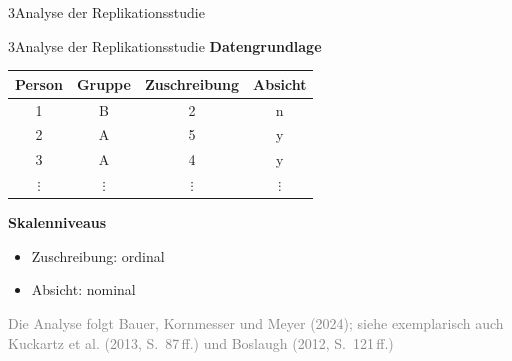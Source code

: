 \documentclass[xcolor=table,9pt,aspectratio=169]{beamer}
\begin{document}
\begin{frame}
\begin{overlayarea}{\textwidth}{0.81\paperheight}{
   \vspace*{11mm}
   \textcolor{uolblue}
   {3\hspace*{1em}Analyse der Replikationsstudie}
}
\end{overlayarea}
\end{frame}


\begin{frame}{\vspace*{10mm}3\hspace*{1em}Analyse der Replikationsstudie}
\textbf{Datengrundlage}\\
\smallskip
\begin{tabular}[h]{cccc}
   \arrayrulecolor{blue2}\hline
   Person     & Gruppe     & Zuschreibung   & Absicht    \\
   \hline
   1          & B          & 2              & n          \\
   2          & A          & 5              & y          \\
   3          & A          & 4              & y          \\
   $\vdots$   & $\vdots$   & $\vdots$       & $\vdots$   \\
   \hline
\end{tabular}

\bigskip
\textbf{Skalenniveaus}\\
\begin{itemize}
   \item Zuschreibung: ordinal
   \item Absicht: nominal
\end{itemize}

\bigskip
\textcolor{gray}{Die Analyse folgt Bauer, Kornmesser und Meyer (2024); siehe exemplarisch auch Kuckartz et al. (2013, S.~87\,ff.) und Boslaugh (2012, S.~121\,ff.)}

\end{frame}
\end{document}
